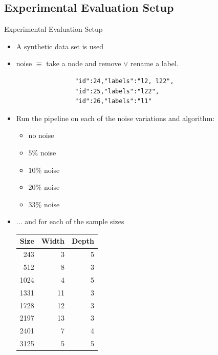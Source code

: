 \documentclass[rgb]{beamer}
\begin{document}
    \subsection{Experimental Evaluation Setup}
        \begin{frame}{Experimental Evaluation Setup}
            \begin{itemize}
                \item A synthetic data set is used
                \item noise $\equiv$ take a node and remove $\vee$ rename a label. \\
                \begin{lstlisting}
                "id":24,"labels":"l2, l22",
                "id":25,"labels":"l22",
                "id":26,"labels":"l1"
                \end{lstlisting}
                \item Run the pipeline on each of the noise variations and algorithm:
                \begin{itemize}
                    \item no noise
                    \item $5\%$ noise
                    \item  $10\%$ noise
                    \item $20\%$ noise
                    \item $33\%$ noise
                \end{itemize} 
                \item $\dots$ and for each of the sample sizes
                \begin{table}[htp]
                     \centering
                     \begin{tabular}{ r r r} \toprule
                            Size & Width & Depth \\ \midrule
                            243 & 3 & 5 \\
                            512 & 8 & 3 \\
                            1024 & 4 & 5 \\
                            1331 & 11 & 3 \\
                            1728 & 12 & 3 \\
                            2197 & 13 & 3 \\
                            2401 & 7 & 4 \\
                            3125 & 5 & 5 \\

\end{tabular}
\end{table}
\end{itemize}
\end{frame}
\end{document}
